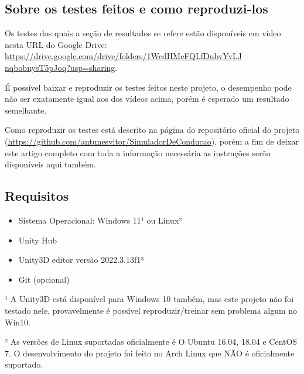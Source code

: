 \begin{apendicesenv}

\partapendices

\chapter{Sobre os testes feitos e como reproduzi-los}

Os testes dos quais a seção de resultados se refere estão disponíveis em vídeo nesta URL do Google Drive: \href{https://drive.google.com/drive/folders/1WcdHMeFQLfDubvYvLJnqbobnysT5pJoq?usp=sharing}{https://drive.google.com/drive/folders/1WcdHMeFQLfDubvYvLJ\\nqbobnysT5pJoq?usp=sharing}.

É possível baixar e reproduzir os testes feitos neste projeto, o desempenho pode não ser exatamente igual aos dos vídeos acima, porém é esperado um resultado semelhante.

Como reproduzir os testes está descrito na página do repositório oficial do projeto (\href{https://github.com/antunesvitor/SimuladorDeConducao}{https://github.com/antunesvitor/SimuladorDeConducao}), porém a fim de deixar este artigo completo com toda a informação necessária as instruções serão disponíveis aqui também.

\section*{Requisitos}

\begin{itemize}
    \item Sistema Operacional: Windows 11¹  ou Linux²
    \item Unity Hub
    \item Unity3D editor versão 2022.3.13f1³
    \item Git (opcional)
\end{itemize}

¹ A Unity3D está disponível para Windows 10 também, mas este projeto não foi testado nele, provavelmente é possível reproduzir/treinar sem problema algum no Win10.

² As versões de Linux suportadas oficialmente é O Ubuntu 16.04, 18.04 e CentOS 7.  O desenvolvimento do projeto foi feito no Arch Linux que NÃO é oficialmente suportado.


\end{apendicesenv}

